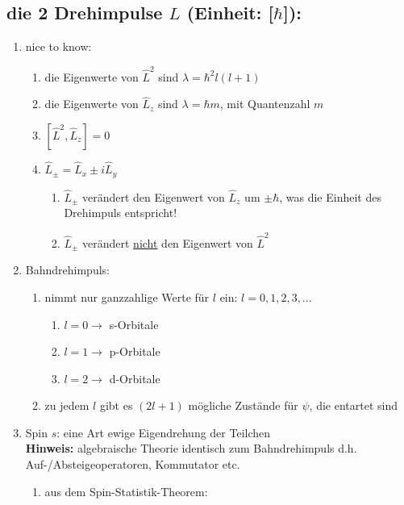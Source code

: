 \subsection{die 2 Drehimpulse $L$ (\textbf{Einheit}: [$\hbar$]):} \label{Drehimpuls}
\begin{enumerate}
    \item nice to know:
    \begin{enumerate}
        \item die Eigenwerte von $\hat{L}^2$ sind $\lambda=\hbar^2 l (l+1)$
        \item die Eigenwerte von $\hat{L}_z$ sind $\lambda=\hbar m$, mit Quantenzahl $m$
        \item $[\hat{L}^2,\hat{L}_z]=0$
        \item $\hat{L}_\pm=\hat{L}_x \pm i\hat{L}_y$
        \begin{enumerate}
            \item $\hat{L}_\pm$ verändert den Eigenwert von $\hat{L}_z$ um $\pm \hbar$, was die Einheit des Drehimpuls entspricht!
            \item $\hat{L}_\pm$ verändert \underline{nicht} den Eigenwert von $\hat{L}^2$
        \end{enumerate}
    \end{enumerate}
    \item Bahndrehimpuls:
    \begin{enumerate}
        \item nimmt nur ganzzahlige Werte für $l$ ein: $l=0,1,2,3,...$
        \begin{enumerate}
            \item $l=0\rightarrow$ s-Orbitale
            \item $l=1\rightarrow$ p-Orbitale
            \item $l=2\rightarrow$ d-Orbitale
        \end{enumerate}
        \item zu jedem $l$ gibt es $(2l+1)$ mögliche Zustände für $\psi$, die entartet sind \label{FormVonPsi}
    \end{enumerate}
    \item Spin $s$: eine Art ewige Eigendrehung der Teilchen \\
    \textbf{Hinweis:} algebraische Theorie identisch zum Bahndrehimpuls d.h. Auf-/Absteigeoperatoren, Kommutator etc.
\begin{enumerate}
    \item aus dem Spin-Statistik-Theorem:
\begin{enumerate}

\end{enumerate}
\end{enumerate}
\end{enumerate}
